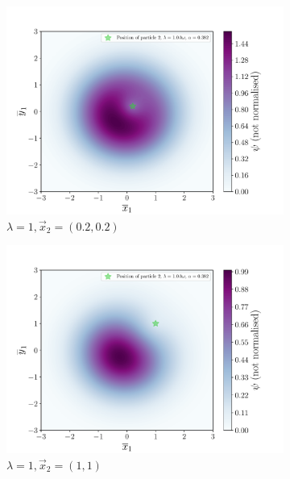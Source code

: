 \documentclass[a4paper,DIV=12,english]{scrartcl}
\begin{document}
\begin{figure}
\begin{subfigure}{0.32\textwidth}
        \includegraphics[width=\textwidth]{../plots/wf/wf_02_02_lambda1.pdf}
        \caption{$\lambda=1, \vec{x}_2 = (0.2, 0.2)$}
        \label{subfig:wf_02_02_1}
    \end{subfigure}
    \begin{subfigure}{0.32\textwidth}
        \centering
        \includegraphics[width=\textwidth]{../plots/wf/wf_1_1_lambda1.pdf}
        \caption{$\lambda=1, \vec{x}_2 = (1, 1)$}
        \label{subfig:wf_1_1_1}
    \end{subfigure} \\
    \begin{subfigure}{0.32\textwidth}
        \centering

\end{subfigure}
\end{figure}
\end{document}
